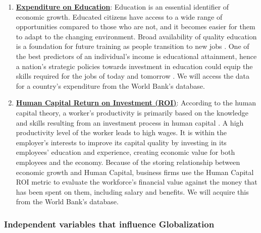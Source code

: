 \documentclass[12pt,oneside]{book} %
\begin{document}
\begin{enumerate}
\item \underline{\textbf{Expenditure on Education}}: Education is an essential identifier of economic growth. Educated citizens have access to a wide range of opportunities compared to those who are not, and it becomes easier for them to adapt to the changing environment. Broad availability of quality education is a foundation for future training as people transition to new jobs \cite{international2010skilled}. One of the best predictors of an individual’s income is educational attainment, hence a nation’s strategic policies towards investment in education could equip the skills required for the jobs of today and tomorrow \cite{mayer2010relationship}. We will access the data for a country’s expenditure from the World Bank’s database.

\item \underline{\textbf{Human Capital Return on Investment (ROI)}}: According to the human capital theory, a worker's productivity is primarily based on the knowledge and skills resulting from an investment process in human capital \cite{becker2009human}. A high productivity level of the worker leads to high wages. It is within the employer's interests to improve its capital quality by investing in its employees' education and experience, creating economic value for both employees and the economy. Because of the storing relationship between economic growth and Human Capital, business firms use the Human Capital ROI metric to evaluate the workforce's financial value against the money that has been spent on them, including salary and benefits. We will acquire this from the World Bank's database.

\end{enumerate}
\subsubsection{Independent variables that influence Globalization}
\end{document}
